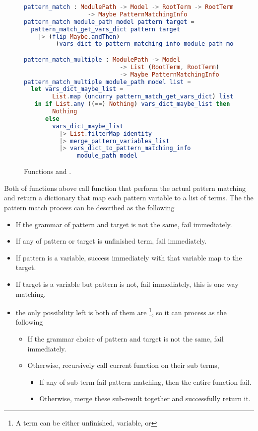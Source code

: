 \documentclass[master.tex]{subfiles}
\begin{document}
\begin{figure}[H]
\begin{framed}
\begin{lstlisting}[language=elm]
pattern_match : ModulePath -> Model -> RootTerm -> RootTerm
                  -> Maybe PatternMatchingInfo
pattern_match module_path model pattern target =
  pattern_match_get_vars_dict pattern target
    |> (flip Maybe.andThen)
         (vars_dict_to_pattern_matching_info module_path model)

pattern_match_multiple : ModulePath -> Model
                           -> List (RootTerm, RootTerm)
                           -> Maybe PatternMatchingInfo
pattern_match_multiple module_path model list =
  let vars_dict_maybe_list =
        List.map (uncurry pattern_match_get_vars_dict) list
   in if List.any ((==) Nothing) vars_dict_maybe_list then
        Nothing
      else
        vars_dict_maybe_list
          |> List.filterMap identity
          |> merge_pattern_variables_list
          |> vars_dict_to_pattern_matching_info
               module_path model
\end{lstlisting}
\end{framed}
\caption{Functions  and .}
\label{fig:implementation-repo-pattern-matching-info}
\end{figure}

Both of functions above call function  that
perform the actual pattern matching and return a dictionary that map each
pattern variable to a list of terms. The the pattern match process can be
described as the following
\begin{itemize}
\item If the grammar of pattern and target is not the same, fail immediately.
\item If any of pattern or target is unfinished term, fail immediately.
\item If pattern is a variable, success immediately with that variable
  map to the target.
\item If target is a variable but pattern is not, fail immediately, this is
  one way matching.
\item the only possibility left is both of them are
  \footnote{A term can be either unfinished, variable, or
    }, so it can process as the following
  \begin{itemize}
  \item If the grammar choice of pattern and target is not the same, fail
    immediately.
  \item Otherwise, recursively call current function on their sub terms,
    \begin{itemize}
      \item If any of sub-term fail pattern matching, then the entire function fail.
      \item Otherwise, merge these sub-result together and successfully return it.
    \end{itemize}
  \end{itemize}
\end{itemize}
\end{document}
